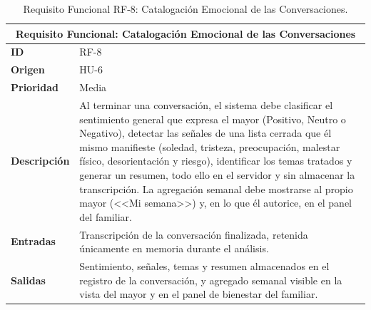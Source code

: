 \begin{table}[htbp]
    \centering
    \caption{Requisito Funcional RF-8: Catalogación Emocional de las Conversaciones.}
    \label{tab:rf8}
    \renewcommand{\arraystretch}{1.3}
    \begin{tabular}{|l|>{\raggedright\arraybackslash}p{}|}
        \hline
        \multicolumn{2}{|c|}{\textbf{Requisito Funcional: Catalogación Emocional de las Conversaciones}} \\
        \hline
        \textbf{ID} & RF-8 \\
        \hline
        \textbf{Origen} & HU-6 \\
        \hline
        \textbf{Prioridad} & Media \\
        \hline
        \textbf{Descripción} & Al terminar una conversación, el sistema debe clasificar el sentimiento general que expresa el mayor (Positivo, Neutro o Negativo), detectar las señales de una lista cerrada que él mismo manifieste (soledad, tristeza, preocupación, malestar físico, desorientación y riesgo), identificar los temas tratados y generar un resumen, todo ello en el servidor y sin almacenar la transcripción. La agregación semanal debe mostrarse al propio mayor (<<Mi semana>>) y, en lo que él autorice, en el panel del familiar. \\
        \hline
        \textbf{Entradas} & Transcripción de la conversación finalizada, retenida únicamente en memoria durante el análisis. \\
        \hline
        \textbf{Salidas} & Sentimiento, señales, temas y resumen almacenados en el registro de la conversación, y agregado semanal visible en la vista del mayor y en el panel de bienestar del familiar. \\
        \hline
    \end{tabular}

\end{table}

